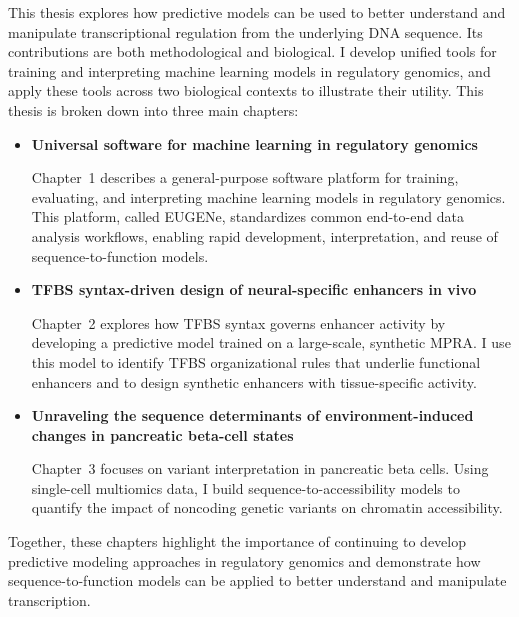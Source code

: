 \begin{dissertationintroduction}
This thesis explores how predictive models can be used to better understand and manipulate transcriptional regulation from the underlying DNA sequence. Its contributions are both methodological and biological. I develop unified tools for training and interpreting machine learning models in regulatory genomics, and apply these tools across two biological contexts to illustrate their utility. This thesis is broken down into three main chapters:

\begin{itemize}
  \item \textbf{Universal software for machine learning in regulatory genomics}

  Chapter~1 describes a general-purpose software platform for training, evaluating, and interpreting machine learning models in regulatory genomics. This platform, called EUGENe, standardizes common end-to-end data analysis workflows, enabling rapid development, interpretation, and reuse of sequence-to-function models.

  \item \textbf{TFBS syntax-driven design of neural-specific enhancers in vivo}

  Chapter~2 explores how TFBS syntax governs enhancer activity by developing a predictive model trained on a large-scale, synthetic MPRA. I use this model to identify TFBS organizational rules that underlie functional enhancers and to design synthetic enhancers with tissue-specific activity.

  \item \textbf{Unraveling the sequence determinants of environment-induced changes in pancreatic beta-cell states}

  Chapter~3 focuses on variant interpretation in pancreatic beta cells. Using single-cell multiomics data, I build sequence-to-accessibility models to quantify the impact of noncoding genetic variants on chromatin accessibility.
\end{itemize}

Together, these chapters highlight the importance of continuing to develop predictive modeling approaches in regulatory genomics and demonstrate how sequence-to-function models can be applied to better understand and manipulate transcription.


\end{dissertationintroduction}
